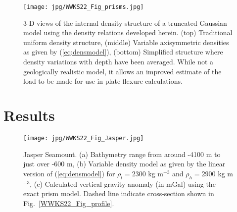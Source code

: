 \begin{figure}[h]
\centering
\texttt{[image: jpg/WWKS22\_Fig\_prisms.jpg]}
\caption{3-D views of the internal density structure of a truncated Gaussian model using the density
relations developed herein. (top) Traditional uniform density structure, (middle) Variable axisymmetric densities
as given by (\ref{eq:densmodel}), (bottom) Simplified structure where density variations with depth
have been averaged.  While not a geologically realistic model, it allows an improved estimate of the load
to be made for use in plate flexure calculations.}
\label{WWKS22_Fig_prisms}
\end{figure}

\section{Results}

\begin{figure}[h]
\centering
\texttt{[image: jpg/WWKS22\_Fig\_Jasper.jpg]}
\caption{Jasper Seamount. (a) Bathymetry range from around -4100 m to just over -600 m, (b) Variable density model
as given by the linear version of (\ref{eq:densmodel}) for $\rho_l = 2300$ kg m$^{-3}$ and $\rho_h = 2900$ kg m$^{-3}$,
(c) Calculated vertical gravity anomaly (in mGal) using the exact prism model.  Dashed line indicate cross-section
shown in Fig.~\ref{WWKS22_Fig_profile}.}
\label{WWKS22_Fig_Jasper}
\end{figure}

